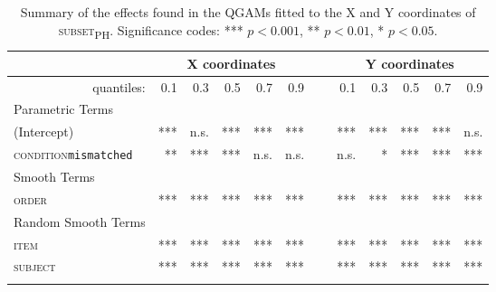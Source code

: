\begin{table}\fontsize{9}{10}
\caption{Summary of the effects found in the QGAMs fitted to the X and Y coordinates of \textsc{subset\textsubscript{PH}}. Significance codes: *** $p < 0.001$, ** $p < 0.01$, * $p < 0.05$.}
\label{tab:8.9}
\centering
\begin{tabular}{lrrrrrrrrrrr}
\lsptoprule
~                   & \multicolumn{5}{c}{X coordinates}       & \multicolumn{1}{c}{}                       & \multicolumn{5}{c}{Y coordinates}                               \\
\midrule
\multicolumn{1}{r}{quantiles:}          & 0.1        & 0.3        & 0.5        & 0.7        & 0.9  & ~       & 0.1        & 0.3        & 0.5        & 0.7        & 0.9         \\
\midrule
Parametric Terms    & \textbf{~} & \textbf{~} & \textbf{~} & \textbf{~} & \textbf{~} & \textbf{~} & \textbf{~} & \textbf{~} & \textbf{~} & \textbf{~}  \\
\midrule
(Intercept)         & ***        & n.s.         & ***        & ***        & *** & ~       & ***        & ***        & ***        & ***        & n.s.          \\
\textsc{condition}\texttt{mismatched} & **       & ***          & ***        & n.s.        & n.s.    & ~    & n.s.       & *        & ***        & ***        & ***         \\
\midrule
Smooth Terms        & \textbf{~} & \textbf{~} & \textbf{~} & \textbf{~} & \textbf{~} & \textbf{~} & \textbf{~} & \textbf{~} & \textbf{~} & \textbf{~}  \\
\midrule
\textsc{order}               & ***        & ***        & ***        & ***        & ***   & ~     & ***        & ***        & ***        & ***        & ***         \\
\midrule
Random Smooth Terms & \textbf{~} & \textbf{~} & \textbf{~} & \textbf{~} & \textbf{~} & \textbf{~} & \textbf{~} & \textbf{~} & \textbf{~} & \textbf{~}  \\
\midrule
\textsc{item}                & ***        & ***        & ***        & ***        & ***   & ~     & ***        & ***        & ***        & ***        & ***         \\
\textsc{subject}             & ***        & ***        & ***        & ***        & ***  & ~      & ***        & ***        & ***        & ***        & ***        \\
\lspbottomrule
\end{tabular}
\end{table}

